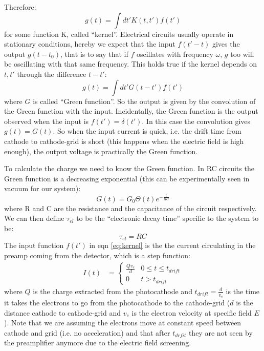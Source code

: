 \documentclass[a4paper,11pt]{article}
\begin{document}
Therefore:
\begin{equation}
g(t) = \int dt' K(t,t') f(t')
\label{eq:kernel}
\end{equation}
for some function K, called ``kernel''. Electrical circuits usually operate in stationary conditions, hereby we expect that the input $f(t'-t)$ gives the output $g(t-t_0)$, that is to say that if $f$ oscillates with frequency $\omega$, $g$ too will be oscillating with that same frequency. This holds true if the kernel  depends on $t,t'$ through the difference $t-t'$:
\begin{equation}
g(t) = \int dt' G(t-t') f(t')
\end{equation}
where $G$ is called ``Green function''. So the output is given by the convolution of the Green function with the input. Incidentally, the Green function is the output observed when the input is $f(t') = \delta(t')$. In this case the convolution gives $g(t) = G(t)$. So when the input current is quick, i.e. the drift time from cathode to cathode-grid is short (this happens when the electric field is high enough), the output voltage is practically the Green function. 

To calculate the charge we need to know the Green function. In RC circuits the Green function is a decreasing exponential (this can be experimentally seen in vacuum for our system):
\begin{equation}
G(t) = G_0 \Theta(t) e^{-\frac{t}{RC}}
\end{equation}
where R and C are the resistance and the capacitance of the circuit respectively. We can then define $\tau_{el}$ to be the ``electronic decay time'' specific to the system to be:
\begin{equation}
\tau_{el} = RC
\end{equation}
The input function $f(t')$ in eqn \ref{eq:kernel} is the the current circulating in the preamp coming from the detector, which is a step function:
\begin{align}
 I(t) &=
  \begin{cases}
   \frac{Q v_e}{d}        & 0 \leq t \leq t_{drift} \\
   0        			& t > t_{drift}
  \end{cases}
\end{align}
where $Q$ is the charge extracted from the photocathode and $t_{drift} = \frac{d}{v_e}$ is the time it takes the electrons to go from the photocathode to the cathode-grid ($d$ is the distance cathode to cathode-grid and $v_e$ is the electron velocity at specific field $E$).
Note that we are assuming the electrons move at constant speed between cathode and grid (i.e. no acceleration) and that after $t_{drfit}$ they are not seen by the preamplifier anymore due to the electric field screening.
\end{document}
